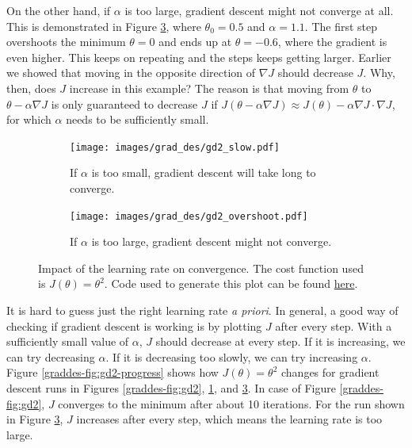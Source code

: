 \documentclass{article}
\theoremstyle{definition}
\begin{document}
On the other hand, if $\alpha$ is too large, gradient descent might not converge at all. This is demonstrated in Figure \ref{graddes-fig:gd2-overshoot}, where $\theta_0=0.5$ and $\alpha = 1.1$. The first step overshoots the minimum $\theta=0$ and ends up at $\theta=-0.6$, where the gradient is even higher. This keeps on repeating and the steps keeps getting larger. Earlier we showed that moving in the opposite direction of $\nabla J$ should decrease $J$. Why, then, does $J$ increase in this example? The reason is that moving from $\theta$ to $\theta-\alpha\nabla J$ is only guaranteed to decrease $J$ if $J(\theta-\alpha\nabla J) \approx J(\theta) - \alpha\nabla J\cdot \nabla J$, for which $\alpha$ needs to be sufficiently small.

\begin{figure}[ht]
    \begin{subfigure}[ht]{\linewidth}
        \centering
        \texttt{[image: images/grad\_des/gd2\_slow.pdf]}
        \caption{If $\alpha$ is too small, gradient descent will take long to converge.}
        \label{graddes-fig:gd2-slow}
    \end{subfigure}%
    
    \begin{subfigure}[ht]{\linewidth}
        \centering
        \texttt{[image: images/grad\_des/gd2\_overshoot.pdf]}
        \caption{If $\alpha$ is too large, gradient descent might not converge.}
        \label{graddes-fig:gd2-overshoot}
    \end{subfigure}%
    
    \caption{Impact of the learning rate on convergence. The cost function used is $J(\theta)=\theta^2$. Code used to generate this plot can be found \href{https://github.com/siavashaslanbeigi/ml_notes/blob/master/src/grad_des/basics.ipynb}{\color{blue} here}.}
\end{figure}

It is hard to guess just the right learning rate \textit{a priori}. In general, a good way of checking if gradient descent is working is by plotting $J$ after every step.
With a sufficiently small value of $\alpha$, $J$ should decrease at every step. If it is increasing, we can try decreasing $\alpha$. If it is decreasing too slowly, we can try increasing $\alpha$.
Figure \ref{graddes-fig:gd2-progress} shows how $J(\theta)=\theta^2$ changes for gradient descent runs in Figures \ref{graddes-fig:gd2}, \ref{graddes-fig:gd2-slow}, and \ref{graddes-fig:gd2-overshoot}. In case of Figure \ref{graddes-fig:gd2}, $J$ converges to the minimum after about 10 iterations. For the run shown in Figure \ref{graddes-fig:gd2-overshoot}, $J$ increases after every step, which means the learning rate is too large.
\end{document}
